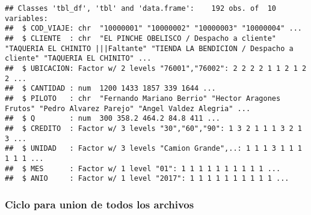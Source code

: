 \documentclass[]{article}
\newenvironment{Shaded}{\begin{snugshade}}{\end{snugshade}}
\newcommand{\KeywordTok}[1]{\textcolor[rgb]{0.13,0.29,0.53}{\textbf{#1}}}
\newcommand{\DecValTok}[1]{\textcolor[rgb]{0.00,0.00,0.81}{#1}}
\newcommand{\StringTok}[1]{\textcolor[rgb]{0.31,0.60,0.02}{#1}}
\newcommand{\CommentTok}[1]{\textcolor[rgb]{0.56,0.35,0.01}{\textit{#1}}}
\newcommand{\ControlFlowTok}[1]{\textcolor[rgb]{0.13,0.29,0.53}{\textbf{#1}}}
\newcommand{\OperatorTok}[1]{\textcolor[rgb]{0.81,0.36,0.00}{\textbf{#1}}}
\newcommand{\NormalTok}[1]{#1}
\begin{document}
\begin{verbatim}
## Classes 'tbl_df', 'tbl' and 'data.frame':    192 obs. of  10 variables:
##  $ COD_VIAJE: chr  "10000001" "10000002" "10000003" "10000004" ...
##  $ CLIENTE  : chr  "EL PINCHE OBELISCO / Despacho a cliente" "TAQUERIA EL CHINITO |||Faltante" "TIENDA LA BENDICION / Despacho a cliente" "TAQUERIA EL CHINITO" ...
##  $ UBICACION: Factor w/ 2 levels "76001","76002": 2 2 2 2 1 1 2 1 2 2 ...
##  $ CANTIDAD : num  1200 1433 1857 339 1644 ...
##  $ PILOTO   : chr  "Fernando Mariano Berrio" "Hector Aragones Frutos" "Pedro Alvarez Parejo" "Angel Valdez Alegria" ...
##  $ Q        : num  300 358.2 464.2 84.8 411 ...
##  $ CREDITO  : Factor w/ 3 levels "30","60","90": 1 3 2 1 1 1 3 2 1 3 ...
##  $ UNIDAD   : Factor w/ 3 levels "Camion Grande",..: 1 1 1 3 1 1 1 1 1 1 ...
##  $ MES      : Factor w/ 1 level "01": 1 1 1 1 1 1 1 1 1 1 ...
##  $ ANIO     : Factor w/ 1 level "2017": 1 1 1 1 1 1 1 1 1 1 ...
\end{verbatim}

\subsubsection{Ciclo para union de todos los
archivos}\label{ciclo-para-union-de-todos-los-archivos}

\begin{Shaded}
\end{Shaded}
\end{document}
